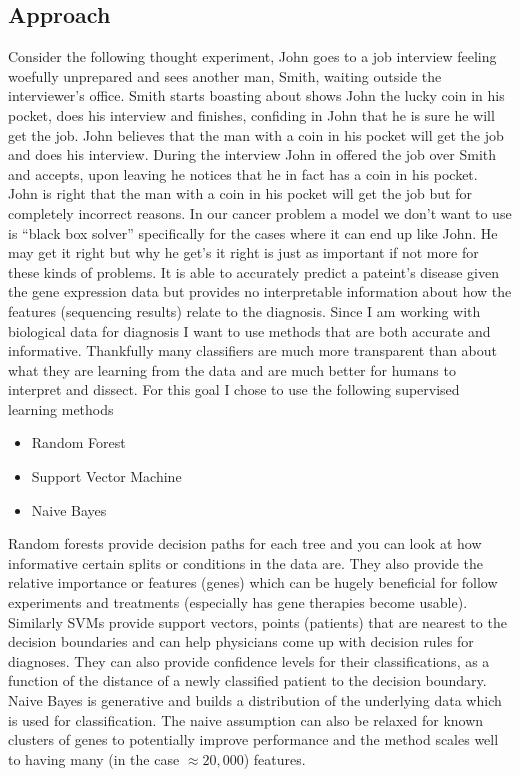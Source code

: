\subsection{Approach}
Consider the following thought experiment, John goes to a job interview feeling woefully unprepared and sees another man, Smith, waiting outside the interviewer's office.
Smith starts boasting about shows John the lucky coin in his pocket, does his interview and finishes, confiding in John that he is sure he will get the job.
John believes that the man with a coin in his pocket will get the job and does his interview.
During the interview John in offered the job over Smith and accepts, upon leaving he notices that he in fact has a coin in his pocket.
John is right that the man with a coin in his pocket will get the job but for completely incorrect reasons.
%
In our cancer problem a model we don't want to use is ``black box solver'' specifically for the cases where it can end up like John.
He may get it right but why he get's it right is just as important if not more for these kinds of problems.
It is able to accurately predict a pateint's disease given the gene expression data but provides no interpretable information about how the features (sequencing results) relate to the diagnosis.
Since I am working with biological data for diagnosis I want to use methods that are both accurate and informative.
%
Thankfully many classifiers are much more transparent than about what they are learning from the data and are much better for humans to interpret and dissect.
For this goal I chose to use the following supervised learning methods
\begin{itemize}
    \item Random Forest
    \item Support Vector Machine
    \item Naive Bayes
\end{itemize}
Random forests provide decision paths for each tree and you can look at how informative certain splits or conditions in the data are.
They also provide the relative importance or features (genes) which can be hugely beneficial for follow experiments and treatments (especially has gene therapies become usable).
Similarly SVMs provide support vectors, points (patients) that are nearest to the decision boundaries and can help physicians come up with decision rules for diagnoses.
They can also provide confidence levels for their classifications, as a function of the distance of a newly classified patient to the decision boundary.
Naive Bayes is generative and builds a distribution of the underlying data which is used for classification.
The naive assumption can also be relaxed for known clusters of genes to potentially improve performance and the method scales well to having many (in the case $\approx 20,000$) features.

